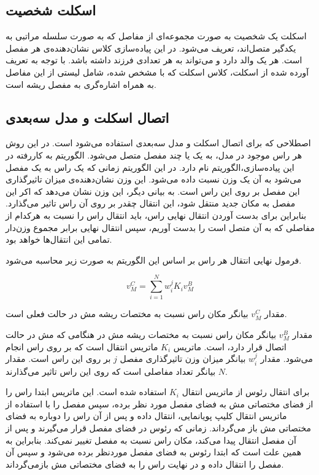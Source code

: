 \subsection{اسکلت شخصیت}

اسکلت یک شخصیت به صورت مجموعه‌ای از مفاصل که به صورت سلسله مراتبی به یکدگیر متصل‌اند، تعریف می‌شود.
در این پیاده‌سازی کلاس 
نشان‌دهنده‌ی هر مفصل است.
هر 
یک والد دارد و می‌تواند به هر تعدادی فرزند داشته باشد.
با توجه به تعریف آورده شده از اسکلت، کلاس اسکلت که با
مشخص شده، شامل لیستی از این مفاصل به همراه اشاره‌گری به مفصل ریشه است.

\subsection{اتصال اسکلت و مدل سه‌بعدی}
اصطلاحی که برای اتصال اسکلت و مدل سه‌بعدی استفاده می‌شود
است.
در این روش هر راس موجود در مدل، به یک یا چند مفصل متصل می‌شود.
الگوریتم به کار‌رفته در این پیاده‌سازی،الگوریتم
نام دارد. در این الگوریتم زمانی که یک راس به یک مفصل می‌شود به آن یک وزن نسبت داده می‌شود.
این وزن نشان‌دهنده‌ی میزان تاثیرگذاری این مفصل بر روی این راس است.
به بیانی دیگر، این وزن نشان می‌دهد که اکر این مفصل به مکان جدید منتقل شود، این انتقال چقدر بر روی آن راس تاثیر می‌گذارد.
بنابراین برای بدست آوردن انتقال نهایی راس، باید انتقال راس را نسبت به هرکدام از مفاصلی که به آن متصل است را بدست آوریم، سپس انتقال نهایی
برابر مجموع وزن‌دار تمامی این انتقال‌ها خواهد بود. 

فرمول نهایی انتقال هر راس بر اساس این الگوریتم به صورت زیر محاسبه می‌شود.

\[ v_M^C = \sum_{i=1}^{N} w_i^j K_i v_M^B \]


مقدار  \( v_M^C \)
بیانگر مکان راس نسبت به مختصات ریشه مش در حالت فعلی است.

مقدار  \( v_M^B \)
بیانگر مکان راس نسبت به مختصات ریشه مش در هنگامی که مش در حالت اتصال قرار دارد، است.
ماتریس \( K_i \)
ماتریس انتقال است که بر روی راس انجام می‌شود.
مقدار \( w_i^j \)
بیانگر میزان وزن تاثیرگذاری مفصل \(j\) 
بر روی این راس است.
مقدار \( N \)
بیانگر تعداد مفاصلی است که روی این راس تاثیر می‌گذارند.


برای انتقال رئوس از ماتریس انتقال \(K_i\) 
استفاده شده است.
این ماتریس ابتدا راس را از فضای مختصاتی مش به فضای مفصل مورد نظر برده، سپس مفصل را با استفاده از ماتریس انتقال کلیپ پویانمایی،
انتقال داده و پس از آن راس را دوباره به فضای مختصاتی مش باز‌ می‌گرداند.
زمانی که رئوس در فضای مفصل قرار می‌گیرند و پس از آن مفصل 
انتقال پیدا می‌کند، مکان راس نسبت به مفصل تغییر نمی‌کند.
بنابراین به همین علت است که ابتدا رئوس به فضای مفصل موردنظر برده می‌شود و سپس آن مفصل را انتقال داده و در نهایت 
راس را به فضای مختصاتی مش باز‌می‌گرداند.

